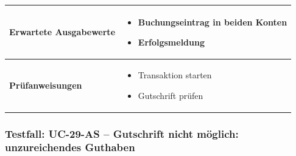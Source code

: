 \documentclass[a4paper,12pt]{article}
\begin{document}
\begin{center}
\begin{tabular}{|p{5cm}|p{10.5cm}|}
\hline
\textbf{Erwartete Ausgabewerte} &
\begin{minipage}[t]{10.5cm}
\begin{itemize}[leftmargin=*]
  \item Buchungseintrag in beiden Konten
  \item Erfolgsmeldung
\end{itemize}
\vspace{0.2cm}
\end{minipage} \\
\hline
\textbf{Prüfanweisungen} &
\begin{minipage}[t]{10.5cm}
\begin{itemize}[leftmargin=*]
  \item Transaktion starten
  \item Gutschrift prüfen
\end{itemize}
\vspace{0.2cm}
\end{minipage} \\
\hline
\end{tabular}
\end{center}

\vspace{1.5cm}

\subsubsection{Testfall: UC-29-AS – Gutschrift nicht möglich: unzureichendes Guthaben}
\vspace{0.5cm}
\end{document}
